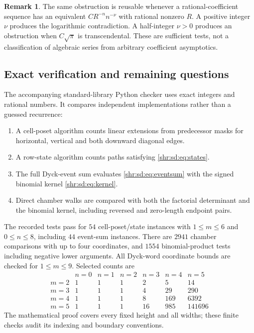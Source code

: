 \documentclass[11pt,letterpaper]{article}
\numberwithin{equation}{section}
\theoremstyle{definition}
\newtheorem{remark}[theorem]{Remark}
\newcommand{\1}{\mathbf 1}
\begin{document}
\begin{remark}
The same obstruction is reusable whenever a rational-coefficient sequence has an equivalent $C R^{-n}n^{-\nu}$ with rational nonzero $R$. A positive integer $\nu$ produces the logarithmic contradiction. A half-integer $\nu>0$ produces an obstruction when $C\sqrt\pi$ is transcendental. These are sufficient tests, not a classification of algebraic series from arbitrary coefficient asymptotics.
\end{remark}

\subsection{Exact verification and remaining questions}
The accompanying standard-library Python checker uses exact integers and rational numbers. It compares independent implementations rather than a guessed recurrence:
\begin{enumerate}
\item A cell-poset algorithm counts linear extensions from predecessor masks for horizontal, vertical and both downward diagonal edges.
\item A row-state algorithm counts paths satisfying \eqref{shr:sd:eq:states}.
\item The full Dyck-event sum evaluates \eqref{shr:sd:eq:eventsum} with the signed binomial kernel \eqref{shr:sd:eq:kernel}.
\item Direct chamber walks are compared with both the factorial determinant and the binomial kernel, including reversed and zero-length endpoint pairs.
\end{enumerate}
The recorded tests pass for $54$ cell-poset/state instances with $1\le m\le6$ and $0\le n\le8$, including $44$ event-sum instances. There are $2941$ chamber comparisons with up to four coordinates, and $1554$ binomial-product tests including negative lower arguments. All Dyck-word coordinate bounds are checked for $1\le m\le9$. Selected counts are
\[
\begin{array}{c|rrrrrr}
 &n=0&n=1&n=2&n=3&n=4&n=5\\\hline
 m=2&1&1&1&2&5&14\\
 m=3&1&1&1&4&29&290\\
 m=4&1&1&1&8&169&6392\\
 m=5&1&1&1&16&985&141696
\end{array}
\]
The mathematical proof covers every fixed height and all widths; these finite checks audit its indexing and boundary conventions.
\end{document}
